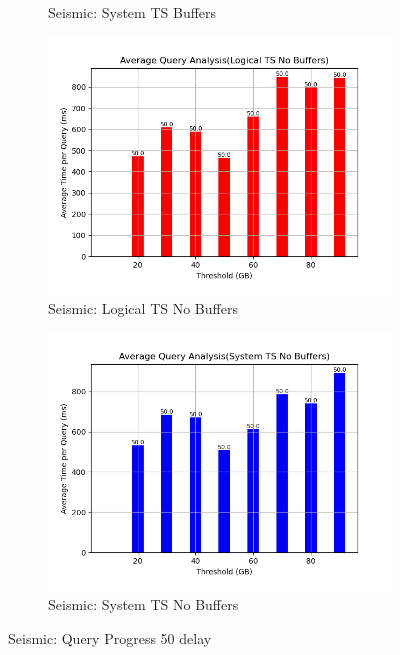 \begin{figure}
\begin{subfigure}[c]{0.45\textwidth}
		\caption{Seismic: System TS Buffers}
		\label{fig:system-ts-50-seismic}
	\end{subfigure}
	\begin{subfigure}[c]{0.45\textwidth}
		\includegraphics[width=1\textwidth]	 {figures/Experiments/Dynamic/SEISMIC/batch_answering/50/average_query_time_per_batch_version_999777016_10485760_10_delay[50].png}
		\caption{Seismic: Logical TS No Buffers}
		\label{fig:logical-ts-no-50-seismic}
	\end{subfigure}
	\begin{subfigure}[c]{0.45\textwidth}
		\includegraphics[width=1\textwidth]	 {figures/Experiments/Dynamic/SEISMIC/batch_answering/50/average_query_time_per_batch_version_999777017_10485760_10_delay[50].png}
		\caption{Seismic: System TS No Buffers}
		\label{fig:system-ts-no-50-seismic}
	\end{subfigure}
	\caption{Seismic: Query Progress 50 delay}
	\label{fig:query-progress-50-seismic}
\end{figure}

